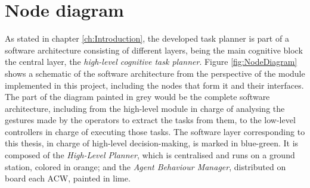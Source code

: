 \section{Node diagram}
\label{sec:NodeDiagram}
As stated in chapter \ref{ch:Introduction}, the developed task planner is part of a software architecture consisting of different layers, being the main cognitive block the central layer, the \emph{high-level cognitive task planner}. Figure \ref{fig:NodeDiagram} shows a schematic of the software architecture from the perspective of the module implemented in this project, including the nodes that form it and their interfaces. The part of the diagram painted in grey would be the complete software architecture, including from the high-level module in charge of analysing the gestures made by the operators to extract the tasks from them, to the low-level controllers in charge of executing those tasks. The software layer corresponding to this thesis, in charge of high-level decision-making, is marked in blue-green. It is composed of the \emph{High-Level Planner}, which is centralised and runs on a ground station, colored in orange; and the \emph{Agent Behaviour Manager}, distributed on board each \gls{ACW}, painted in lime.

